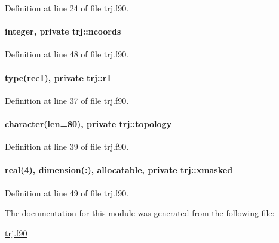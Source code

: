 Definition at line 24 of file trj.\-f90.

\hypertarget{classtrj_aff4c766e3802d44c4064fe02cc46c5c7}{
\paragraph[{ncoords}]{\setlength{\rightskip}{0pt plus 5cm}integer, private trj\-::ncoords\hspace{0.3cm}{\ttfamily [private]}}}\label{classtrj_aff4c766e3802d44c4064fe02cc46c5c7}


Definition at line 48 of file trj.\-f90.

\hypertarget{classtrj_acf470327c3f403618e7baa2a0ea78d67}{
\paragraph[{r1}]{\setlength{\rightskip}{0pt plus 5cm}type({\bf rec1}), private trj\-::r1\hspace{0.3cm}{\ttfamily [private]}}}\label{classtrj_acf470327c3f403618e7baa2a0ea78d67}


Definition at line 37 of file trj.\-f90.

\hypertarget{classtrj_a4c4bd9f146c2196f65befad1b0de347c}{
\paragraph[{topology}]{\setlength{\rightskip}{0pt plus 5cm}character(len=80), private trj\-::topology\hspace{0.3cm}{\ttfamily [private]}}}\label{classtrj_a4c4bd9f146c2196f65befad1b0de347c}


Definition at line 39 of file trj.\-f90.

\hypertarget{classtrj_a2f46430a700e35ee26d619ce6d99dfd3}{
\paragraph[{xmasked}]{\setlength{\rightskip}{0pt plus 5cm}real(4), dimension(\-:), allocatable, private trj\-::xmasked\hspace{0.3cm}{\ttfamily [private]}}}\label{classtrj_a2f46430a700e35ee26d619ce6d99dfd3}


Definition at line 49 of file trj.\-f90.



The documentation for this module was generated from the following file\-:\begin{DoxyCompactItemize}
\item 
\hyperlink{trj_8f90}{trj.\-f90}\end{DoxyCompactItemize}
